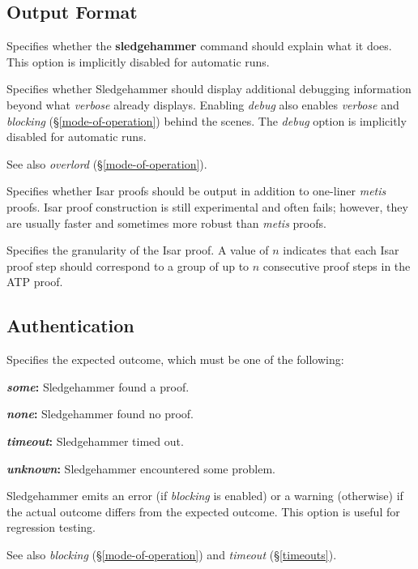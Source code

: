 \documentclass[a4paper,12pt]{article}
\begin{document}
\subsection{Output Format}
\label{output-format}

\begin{enum}

Specifies whether the \textbf{sledgehammer} command should explain what it does.
This option is implicitly disabled for automatic runs.

Specifies whether Sledgehammer should display additional debugging information
beyond what \textit{verbose} already displays. Enabling \textit{debug} also
enables \textit{verbose} and \textit{blocking} (\S\ref{mode-of-operation})
behind the scenes. The \textit{debug} option is implicitly disabled for
automatic runs.

\nopagebreak
{\small See also \textit{overlord} (\S\ref{mode-of-operation}).}

Specifies whether Isar proofs should be output in addition to one-liner
\textit{metis} proofs. Isar proof construction is still experimental and often
fails; however, they are usually faster and sometimes more robust than
\textit{metis} proofs.

Specifies the granularity of the Isar proof. A value of $n$ indicates that each
Isar proof step should correspond to a group of up to $n$ consecutive proof
steps in the ATP proof.
\end{enum}

\subsection{Authentication}
\label{authentication}

\begin{enum}
Specifies the expected outcome, which must be one of the following:

\begin{enum}
\item[\labelitemi] \textbf{\textit{some}:} Sledgehammer found a proof.
\item[\labelitemi] \textbf{\textit{none}:} Sledgehammer found no proof.
\item[\labelitemi] \textbf{\textit{timeout}:} Sledgehammer timed out.
\item[\labelitemi] \textbf{\textit{unknown}:} Sledgehammer encountered some
problem.
\end{enum}

Sledgehammer emits an error (if \textit{blocking} is enabled) or a warning
(otherwise) if the actual outcome differs from the expected outcome. This option
is useful for regression testing.

\nopagebreak
{\small See also \textit{blocking} (\S\ref{mode-of-operation}) and
\textit{timeout} (\S\ref{timeouts}).}
\end{enum}
\end{document}
